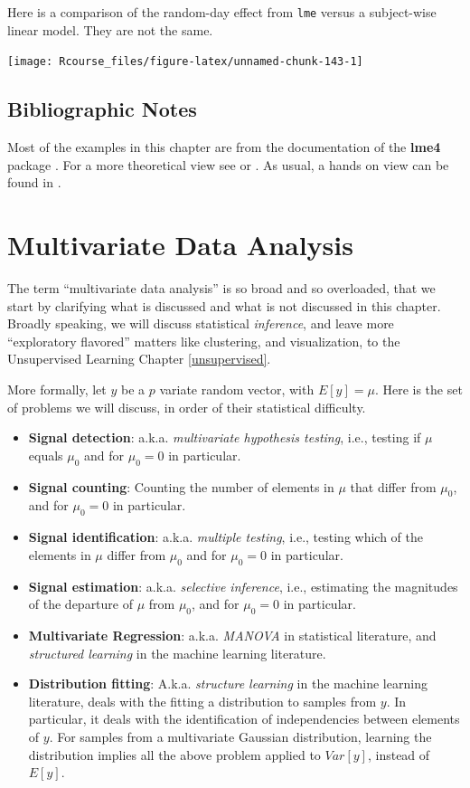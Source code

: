 \documentclass[]{book}
\providecommand{\tightlist}{%
  \setlength{\itemsep}{0pt}\setlength{\parskip}{0pt}}
\theoremstyle{definition}
\theoremstyle{definition}
\theoremstyle{remark}
\begin{document}
Here is a comparison of the random-day effect from \texttt{lme} versus a
subject-wise linear model. They are not the same.

\texttt{[image: Rcourse\_files/figure-latex/unnamed-chunk-143-1]}

\section{Bibliographic Notes}\label{bibliographic-notes-5}

Most of the examples in this chapter are from the documentation of the
\textbf{lme4} package \citep{lme4}. For a more theoretical view see
\citet{weiss2005modeling} or \citet{searle2009variance}. As usual, a
hands on view can be found in \citet{venables2013modern}.

\chapter{Multivariate Data Analysis}\label{multivariate}

The term ``multivariate data analysis'' is so broad and so overloaded,
that we start by clarifying what is discussed and what is not discussed
in this chapter. Broadly speaking, we will discuss statistical
\emph{inference}, and leave more ``exploratory flavored'' matters like
clustering, and visualization, to the Unsupervised Learning Chapter
\ref{unsupervised}.

More formally, let \(y\) be a \(p\) variate random vector, with
\(E[y]=\mu\). Here is the set of problems we will discuss, in order of
their statistical difficulty.

\begin{itemize}
\tightlist
\item
  \textbf{Signal detection}: a.k.a. \emph{multivariate hypothesis
  testing}, i.e., testing if \(\mu\) equals \(\mu_0\) and for
  \(\mu_0=0\) in particular.
\item
  \textbf{Signal counting}: Counting the number of elements in \(\mu\)
  that differ from \(\mu_0\), and for \(\mu_0=0\) in particular.
\item
  \textbf{Signal identification}: a.k.a. \emph{multiple testing}, i.e.,
  testing which of the elements in \(\mu\) differ from \(\mu_0\) and for
  \(\mu_0=0\) in particular.
\item
  \textbf{Signal estimation}: a.k.a. \emph{selective inference}, i.e.,
  estimating the magnitudes of the departure of \(\mu\) from \(\mu_0\),
  and for \(\mu_0=0\) in particular.
\item
  \textbf{Multivariate Regression}: a.k.a. \emph{MANOVA} in statistical
  literature, and \emph{structured learning} in the machine learning
  literature.
\item
  \textbf{Distribution fitting}: A.k.a. \emph{structure learning} in the
  machine learning literature, deals with the fitting a distribution to
  samples from \(y\). In particular, it deals with the identification of
  independencies between elements of \(y\). For samples from a
  multivariate Gaussian distribution, learning the distribution implies
  all the above problem applied to \(Var[y]\), instead of \(E[y]\).
\end{itemize}
\end{document}
